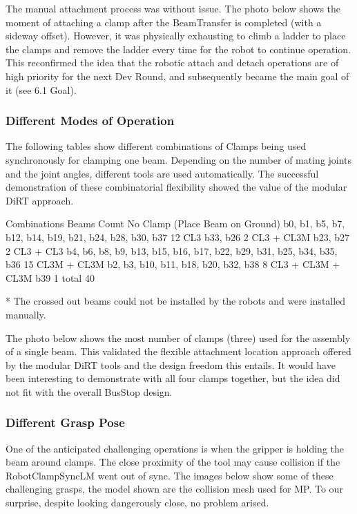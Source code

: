 The manual attachment process was without issue. The photo below shows the moment of attaching a clamp after the BeamTransfer is completed (with a sideway offset). However, it was physically exhausting to climb a ladder to place the clamps and remove the ladder every time for the robot to continue operation. This reconfirmed the idea that the robotic attach and detach operations are of high priority for the next Dev Round, and subsequently became the main goal of it (see 6.1 Goal).

\subsubsection{Different Modes of Operation}
The following tables show different combinations of Clamps being used synchronously for clamping one beam. Depending on the number of mating joints and the joint angles, different tools are used automatically. The successful demonstration of these combinatorial flexibility showed the value of the modular DiRT approach. 

Combinations
Beams
Count
No Clamp
(Place Beam on Ground)
b0, b1, b5, b7, b12, b14, b19, b21, b24, b28, b30, b37
12
CL3
b33, b26
2
CL3 + CL3M
b23, b27
2
CL3 + CL3
b4, b6, b8, b9, b13, b15, b16, b17, b22, b29, b31, b25, b34, b35, b36
15
CL3M + CL3M
b2, b3, b10, b11, b18, b20, b32, b38
8
CL3 + CL3M + CL3M
b39
1
total
40

* The crossed out beams could not be installed by the robots and were installed manually.

The photo below shows the most number of clamps (three) used for the assembly of a single beam. This validated the flexible attachment location approach offered by the modular DiRT tools and the design freedom this entails. It would have been interesting to demonstrate with all four clamps together, but the idea did not fit with the overall BusStop design.


\subsubsection{Different Grasp Pose}
One of the anticipated challenging operations is when the gripper is holding the beam around clamps. The close proximity of the tool may cause collision if the RobotClampSyncLM went out of sync. The images below show some of these challenging grasps, the model shown are the collision mesh used for MP. To our surprise, despite looking dangerously close, no problem arised.


